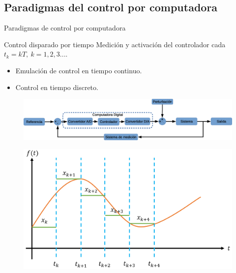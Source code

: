 \subsection{Paradigmas del control por computadora}
\begin{frame}{Paradigmas de control por computadora}
\vspace{-0.1cm}
\centering
	\begin{block}{\small Control disparado por tiempo}
		\tiny Medición y activación del controlador cada $t_k = kT, ~ k = 1,2,3....$
	\begin{itemize}
		\tiny
		\item Emulación de control en tiempo continuo.
		\item Control en tiempo discreto.
	\end{itemize}
	\end{block}	
	\vspace{-0.2cm}
	\begin{figure}
		\begin{center}
			\includegraphics[scale=0.25]{Introduccion/EsqCtrlDispTiempDisc.eps}  
		\end{center}
	\end{figure}
	\begin{figure}
		\begin{center}
			\includegraphics[scale=0.25]{Introduccion/senal-sinc.png}  
		\end{center}
	\end{figure}
\end{frame}

